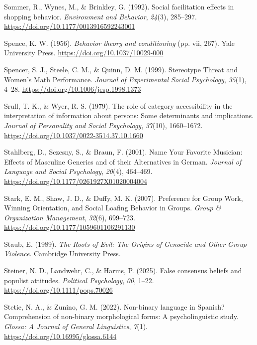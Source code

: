 \documentclass[
  letterpaper,
]{book}
\newlength{\cslhangindent}
\newenvironment{CSLReferences}[2] %
 {\begin{list}{}{%
  \setlength{\itemindent}{0pt}
  \setlength{\leftmargin}{0pt}
  \setlength{\parsep}{0pt}
  \ifodd #1
   \setlength{\leftmargin}{\cslhangindent}
   \setlength{\itemindent}{-1\cslhangindent}
  \fi
  \setlength{\itemsep}{#2\baselineskip}}}
 {\end{list}}
\begin{document}
\begin{CSLReferences}{1}{0}
Sommer, R., Wynes, M., \& Brinkley, G. (1992). Social facilitation
effects in shopping behavior. \emph{Environment and Behavior},
\emph{24}(3), 285--297. \url{https://doi.org/10.1177/0013916592243001}

Spence, K. W. (1956). \emph{Behavior theory and conditioning} (pp. vii,
267). Yale University Press. \url{https://doi.org/10.1037/10029-000}

Spencer, S. J., Steele, C. M., \& Quinn, D. M. (1999). Stereotype
{Threat} and {Women}'s {Math} {Performance}. \emph{Journal of
Experimental Social Psychology}, \emph{35}(1), 4--28.
\url{https://doi.org/10.1006/jesp.1998.1373}

Srull, T. K., \& Wyer, R. S. (1979). The role of category accessibility
in the interpretation of information about persons: {Some} determinants
and implications. \emph{Journal of Personality and Social Psychology},
\emph{37}(10), 1660--1672.
\url{https://doi.org/10.1037/0022-3514.37.10.1660}

Stahlberg, D., Sczesny, S., \& Braun, F. (2001). Name {Your} {Favorite}
{Musician}: {Effects} of {Masculine} {Generics} and of their
{Alternatives} in {German}. \emph{Journal of Language and Social
Psychology}, \emph{20}(4), 464--469.
\url{https://doi.org/10.1177/0261927X01020004004}

Stark, E. M., Shaw, J. D., \& Duffy, M. K. (2007). Preference for
{Group} {Work}, {Winning} {Orientation}, and {Social} {Loafing}
{Behavior} in {Groups}. \emph{Group \& Organization Management},
\emph{32}(6), 699--723. \url{https://doi.org/10.1177/1059601106291130}

Staub, E. (1989). \emph{The {Roots} of {Evil}: {The} {Origins} of
{Genocide} and {Other} {Group} {Violence}}. Cambridge University Press.

Steiner, N. D., Landwehr, C., \& Harms, P. (2025). False consensus
beliefs and populist attitudes. \emph{Political Psychology}, \emph{00},
1--22. \url{https://doi.org/10.1111/pops.70026}

Stetie, N. A., \& Zunino, G. M. (2022). Non-binary language in
{Spanish}? {Comprehension} of non-binary morphological forms: A
psycholinguistic study. \emph{Glossa: A Journal of General Linguistics},
\emph{7}(1). \url{https://doi.org/10.16995/glossa.6144}


\end{CSLReferences}
\end{document}
